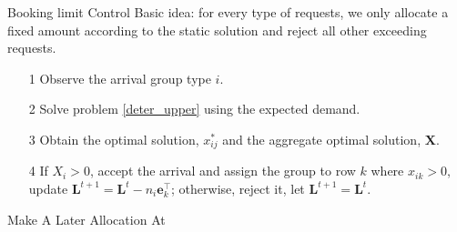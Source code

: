       \begin{frame}{Booking limit Control}
        Basic idea: for every type of requests, we only allocate a fixed amount according to the static solution and reject all other exceeding requests.
        \begin{itemize}
          \item[1] Observe the arrival group type $i$.
          \item[2] Solve problem \eqref{deter_upper} using the expected demand.
          \item[3] Obtain the optimal solution, $x_{ij}^{*}$ and the aggregate optimal solution, $\mathbf{X}$.
          \item[4] If $X_{i} > 0$, accept the arrival and assign the group to row $k$ where $x_{ik} > 0$, update $\mathbf{L}^{t+1} = \mathbf{L}^{t} - n_i \mathbf{e}_{k}^{\top}$; otherwise, reject it, let $\mathbf{L}^{t+1} = \mathbf{L}^{t}$.
        \end{itemize}
                 
      \end{frame}

      \begin{frame}{Make A Later Allocation}
        At 
      \end{frame}